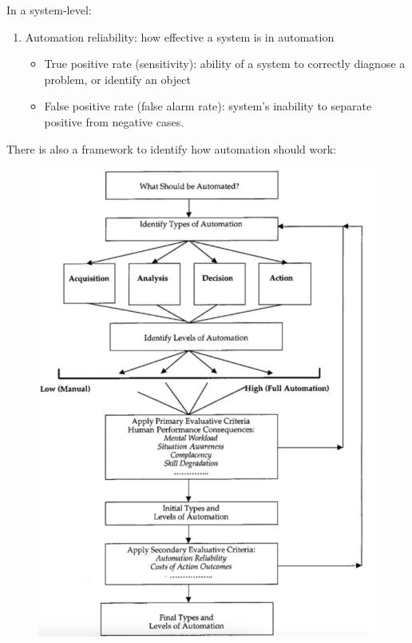 \documentclass{article}
\begin{document}
In a system-level:
\begin{enumerate}
    \item Automation reliability: how effective a system is in automation
    \begin{itemize}
        \item True positive rate (sensitivity): ability of a system to correctly diagnose a problem, or identify an object
        \item False positive rate (false alarm rate): system's inability to separate positive from negative cases.
    \end{itemize}
\end{enumerate}
There is also a framework to identify how automation should work:
\begin{figure}[H]
    \centering
    \includegraphics[width=0.5\linewidth]{Pictures/Screenshot 2023-03-01 at 12.25.15.png}
\end{figure}
\end{document}
